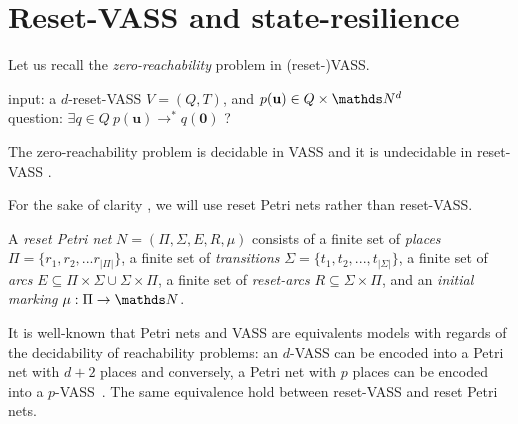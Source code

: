 

\section{Reset-VASS and state-resilience}\label{appendix}






Let us recall the {\em zero-reachability} problem in (reset-)VASS.

\noindent
input: a $d$-reset-VASS $V=(Q,T)$, and $p(\textbf{u}) \in Q \times \N^d$ \\
question:  $\exists q \in Q ~ p(\textbf{u}) \to^* q(\textbf{0})$ ?

The zero-reachability problem is decidable in VASS and it is undecidable in reset-VASS \cite{araki1976PN}.

For the sake of clarity , we will use reset Petri nets rather than reset-VASS. 

A \emph{reset Petri net} $N = (\Pi, \Sigma, E, R, \mu)$ consists of a finite set of {\em places} $\Pi = \{r_1, r_2, ... r_{|\Pi|}\}$, a finite set of {\em transitions} $\Sigma = \{t_1, t_2, ..., t_{|\Sigma|} \}$, a finite set of {\em arcs} $E \subseteq \Pi \times \Sigma \cup \Sigma \times \Pi$, a finite set of
{\em reset-arcs} $R \subseteq \Sigma \times \Pi$, and an {\em initial marking} $\mu : \Pi \to \N$.

It is well-known that Petri nets and VASS are equivalents models with regards of the decidability of reachability problems: an $d$-VASS can be encoded into a Petri net with $d+2$ places and conversely, a Petri net with $p$ places can be encoded into a $p$-VASS~\cite{DBLP:journals/siglog/Schmitz16}. The same equivalence hold between reset-VASS and reset Petri nets.



